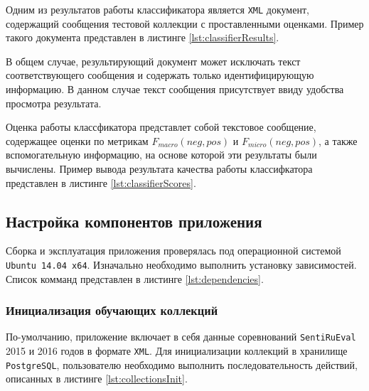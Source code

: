     Одним из результатов работы классификатора является {\tt XML} документ,
    содержащий сообщения тестовой коллекции с проставленными оценками.
    Пример такого документа представлен в листинге \ref{lst:classifierResults}.
    \lstset{style=xml}
    

    В общем случае, результирующий документ
    может исключать текст соответствующего сообщения и содержать только
    идентифицирующую информацию. В данном случае текст сообщения присутствует
    ввиду удобства просмотра результата.

    Оценка работы классфикатора представлет собой текстовое сообщение,
    содержащее оценки по метрикам  $F_{macro}(neg, pos)$ и $F_{micro}(neg, pos)$,
    а также вспомогательную информацию, на основе которой эти результаты были
    вычислены. Пример вывода результата качества работы классифкатора представлен
    в листинге \ref{lst:classifierScores}.
    \lstset{style=xml}
    

    \subsection{Настройка компонентов приложения}
    Сборка и эксплуатация приложения проверялась под операционной системой
    {\tt Ubuntu 14.04 x64}. Изначально необходимо выполнить установку зависимостей.
    Список комманд представлен в листинге \ref{lst:dependencies}.
    \lstset{style=bash}
    

    \subsubsection{Инициализация обучающих коллекций}
        По-умолчанию, приложение включает в себя данные соревнований {\tt SentiRuEval}
        2015 и 2016 годов в формате {\tt XML}. Для инициализации коллекций в хранилище
        {\tt PostgreSQL}, пользователю необходимо выполнить последовательность
        действий, описанных в листинге \ref{lst:collectionsInit}.
        \lstset{style=bash}
        

